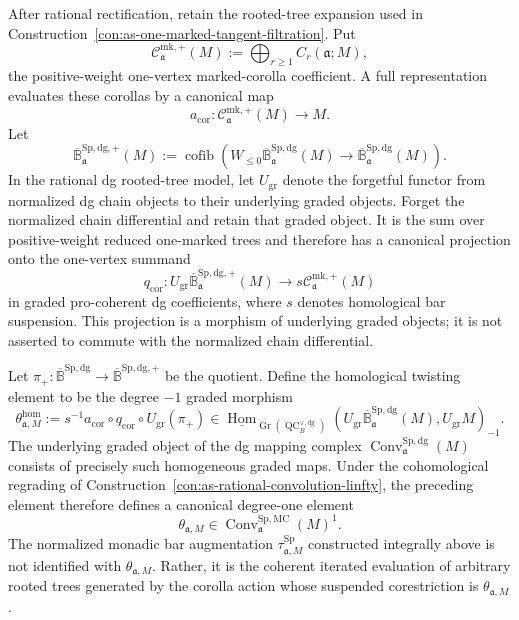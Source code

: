 \begin{construction}
\label{con:as-convolution-twisting-element}
After rational rectification, retain the rooted-tree expansion used in
Construction~\ref{con:as-one-marked-tangent-filtration}.  Put
\[
\boxed{
    \mathcal C_{\mathfrak a}^{\mathrm{mk},+}(M)
    :=
    \bigoplus_{r\ge1}C_r(\mathfrak a;M),
}
\]
the positive-weight one-vertex marked-corolla coefficient.  A full
representation evaluates these corollas by a canonical map
\[
    a_{\mathrm{cor}}:
    \mathcal C_{\mathfrak a}^{\mathrm{mk},+}(M)
    \longrightarrow M.
\]
Let
\[
    \overline{\mathbb B}^{\mathrm{Sp,dg},+}_{\mathfrak a}(M)
    :=
    \operatorname{cofib}
    \left(
        W_{\le0}\overline{\mathbb B}^{\mathrm{Sp,dg}}_{\mathfrak a}(M)
        \longrightarrow
        \overline{\mathbb B}^{\mathrm{Sp,dg}}_{\mathfrak a}(M)
    \right).
\]
In the rational dg rooted-tree model, let $U_{\mathrm{gr}}$ denote the
forgetful functor from normalized dg chain objects to their underlying graded
objects.  Forget the normalized chain differential and retain that graded
object.  It is the sum over positive-weight reduced one-marked trees and
therefore has a canonical projection onto the one-vertex summand
\[
\boxed{
    q_{\mathrm{cor}}:
    U_{\mathrm{gr}}
    \overline{\mathbb B}^{\mathrm{Sp,dg},+}_{\mathfrak a}(M)
    \longrightarrow
    s\mathcal C_{\mathfrak a}^{\mathrm{mk},+}(M)
}
\]
in graded pro-coherent dg coefficients, where $s$ denotes homological bar
suspension.  This projection is a morphism of underlying graded objects; it
is not asserted to commute with the normalized chain differential.

Let
$\pi_+:\overline{\mathbb B}^{\mathrm{Sp,dg}}\to
\overline{\mathbb B}^{\mathrm{Sp,dg},+}$ be the quotient.  Define the homological
twisting element to be the degree $-1$ graded morphism
\[
\boxed{
    \theta_{\mathfrak a,M}^{\mathrm{hom}}
    :=
    s^{-1}a_{\mathrm{cor}}
    \circ q_{\mathrm{cor}}
    \circ U_{\mathrm{gr}}(\pi_+)
    \in
    \underline{\operatorname{Hom}}_{
        \operatorname{Gr}(\operatorname{QC}^{\vee,\mathrm{dg}}_B)}
    \left(
        U_{\mathrm{gr}}
        \overline{\mathbb B}^{\mathrm{Sp,dg}}_{\mathfrak a}(M),
        U_{\mathrm{gr}}M
    \right)_{-1}.
}
\]
The underlying graded object of the dg mapping complex
$\operatorname{Conv}^{\mathrm{Sp,dg}}_{\mathfrak a}(M)$ consists of precisely
such homogeneous graded maps.  Under the cohomological regrading of
Construction~\ref{con:as-rational-convolution-linfty}, the preceding element
therefore defines a canonical degree-one element
\[
\boxed{
    \theta_{\mathfrak a,M}
    \in
    \operatorname{Conv}^{\mathrm{Sp,MC}}_{\mathfrak a}(M)^1.
}
\]
The normalized monadic bar augmentation
$\tau_{\mathfrak a,M}^{\mathrm{Sp}}$ constructed integrally above is not
identified with $\theta_{\mathfrak a,M}$.  Rather, it is the coherent
iterated evaluation of arbitrary rooted trees generated by the corolla action
whose suspended corestriction is $\theta_{\mathfrak a,M}$.
\end{construction}

